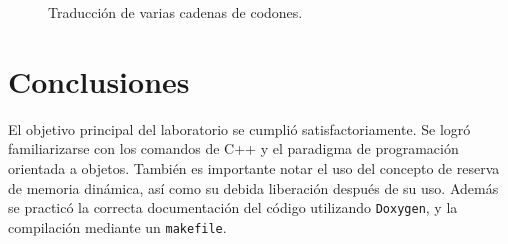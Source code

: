 \begin{figure}[htbp]
\centering
{}
\caption{Traducción de varias cadenas de codones.} \label{fig:trans2}
\end{figure}

\section{Conclusiones}
El objetivo principal del laboratorio se cumplió satisfactoriamente. Se logró familiarizarse con los comandos de C++ y el paradigma de programación orientada a objetos. También es importante notar el uso del concepto de reserva de memoria dinámica, así como su debida liberación después de su uso. Además se practicó la correcta documentación del código utilizando \texttt{Doxygen}, y la compilación mediante un \texttt{makefile}. 
